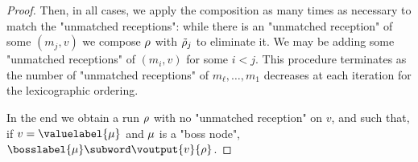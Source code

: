 \begin{proof}
Then, in all cases, we apply the composition as many times as necessary to match the "unmatched receptions": while there is an "unmatched reception" of some $(m_j,v)$ we compose $\rho$ with $\Tilde{\rho}_j$ to eliminate it. We may be adding some "unmatched receptions" of $(m_i, v)$ for some $i<j$.
This procedure terminates as the number of "unmatched receptions" of $m_\ell, \ldots, m_1$ decreases at each iteration for the lexicographic ordering.

In the end we obtain a run $\rho$ with no "unmatched reception" on $v$, and such that, if $v = \valuelabel{\node}$ and $\mu$ is a "boss node", $\bosslabel{\node} \subword \voutput{v}{\run}$.



 



\end{proof}

